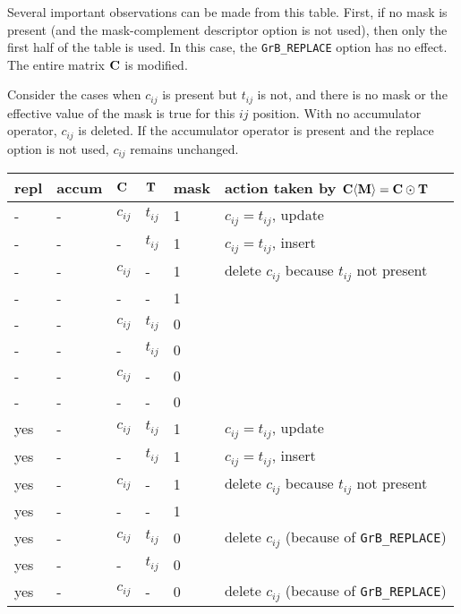 \documentclass[12pt]{article}
\begin{document}
Several important observations can be made from this table.  First,
if no mask is present (and the mask-complement descriptor option is not used),
then only the first half of the table is used.  In this case, the \verb'GrB_REPLACE'
option has no effect.  The entire matrix ${\bf C}$ is modified.

Consider the cases when $c_{ij}$ is present but $t_{ij}$ is not, and there is no
mask or the effective value of the mask is true for this ${ij}$ position.  With
no accumulator operator, $c_{ij}$ is deleted.  If the accumulator operator is
present and the replace option is not used, $c_{ij}$ remains unchanged.

\begin{table}
{\small
\begin{tabular}{lllll|l}
\hline
repl & accum & ${\bf C}$ & ${\bf T}$ & mask & action taken by ${\bf C \langle M \rangle = C \odot T}$ \\
\hline
    -  &-   & $c_{ij}$ & $t_{ij}$  & 1    &  $c_{ij} = t_{ij}$, update \\
    -  &-   &  -       & $t_{ij}$  & 1    &  $c_{ij} = t_{ij}$, insert \\
    -  &-   & $c_{ij}$ &  -        & 1    &  delete $c_{ij}$ because $t_{ij}$ not present \\
    -  &-   &  -       &  -        & 1    &   \\
    -  &-   & $c_{ij}$ & $t_{ij}$  & 0    &   \\
    -  &-   &  -       & $t_{ij}$  & 0    &   \\
    -  &-   & $c_{ij}$ &  -        & 0    &   \\
    -  &-   &  -       &  -        & 0    &   \\
\hline
    yes&-   & $c_{ij}$ & $t_{ij}$  & 1    &  $c_{ij} = t_{ij}$, update \\
    yes&-   &  -       & $t_{ij}$  & 1    &  $c_{ij} = t_{ij}$, insert \\
    yes&-   & $c_{ij}$ &  -        & 1    &  delete $c_{ij}$ because $t_{ij}$ not present \\
    yes&-   &  -       &  -        & 1    &   \\
    yes&-   & $c_{ij}$ & $t_{ij}$  & 0    &  delete $c_{ij}$  (because of \verb'GrB_REPLACE') \\
    yes&-   &  -       & $t_{ij}$  & 0    &   \\
    yes&-   & $c_{ij}$ &  -        & 0    &  delete $c_{ij}$  (because of \verb'GrB_REPLACE') \\

\end{tabular}}
\end{table}
\end{document}
